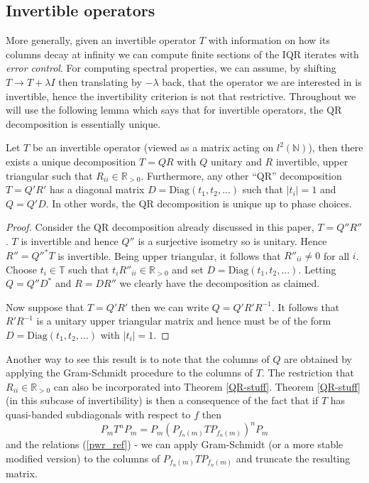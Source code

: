 \documentclass[a4paper,10pt]{article}
\begin{document}
\subsection{Invertible operators}
\label{invert_comp}

More generally, given an invertible operator $T$ with information on how its columns decay at infinity we can compute finite sections of the IQR iterates with \textit{error control}. For computing spectral properties, we can assume, by shifting $T\rightarrow T+\lambda I$ then translating by $-\lambda$ back, that the operator we are interested in is invertible, hence the invertibility criterion is not that restrictive. Throughout we will use the following lemma which says that for invertible operators, the QR decomposition is essentially unique.

\begin{lemma}
Let $T$ be an invertible operator (viewed as a matrix acting on $l^2(\mathbb{N})$), then there exists a unique decomposition $T=QR$ with $Q$ unitary and $R$ invertible, upper triangular such that $R_{ii}\in\mathbb{R}_{>0}$. Furthermore, any other ``QR'' decomposition $T=Q'R'$ has a diagonal matrix $D=\mathrm{Diag}(t_1,t_2,...)$ such that $\left|t_i\right|=1$ and $Q=Q'D$. In other words, the QR decomposition is unique up to phase choices.
\end{lemma}
\begin{proof}
Consider the QR decomposition already discussed in this paper, $T=Q''R''$. $T$ is invertible and hence $Q''$ is a surjective isometry so is unitary. Hence $R''=Q''^*T$ is invertible. Being upper triangular, it follows that $R''_{ii}\neq 0$ for all $i$. Choose $t_i\in \mathbb{T}$ such that $t_iR''_{ii}\in\mathbb{R}_{>0}$ and set $D=\mathrm{Diag}(t_1,t_2,...)$. Letting $Q=Q''D^*$ and $R=DR''$ we clearly have the decomposition as claimed.

Now suppose that $T=Q'R'$ then we can write $Q=Q'R'R^{-1}$. It follows that $R'R^{-1}$ is a unitary upper triangular matrix and hence must be of the form $D=\mathrm{Diag}(t_1,t_2,...)$ with $\left|t_i\right|=1$.
\end{proof}

Another way to see this result is to note that the columns of $Q$ are obtained by applying the Gram-Schmidt procedure to the columns of $T$. The restriction that $R_{ii}\in\mathbb{R}_{>0}$ can also be incorporated into Theorem \ref{QR-stuff}. Theorem \ref{QR-stuff} (in this subcase of invertibility) is then a consequence of the fact that if $T$ has quasi-banded subdiagonals with respect to $f$ then
$$
P_mT^nP_m=P_m(P_{f_n(m)}TP_{f_n(m)})^nP_m
$$
and the relations (\ref{pwr_ref}) - we can apply Gram-Schmidt (or a more stable modified version) to the columns of $P_{f_n(m)}TP_{f_n(m)}$ and truncate the resulting matrix.
\end{document}
